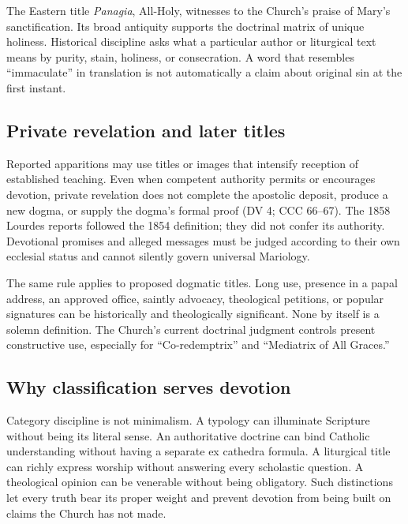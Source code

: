 The Eastern title \emph{Panagia}, All-Holy, witnesses to the Church's praise of Mary's sanctification. Its broad antiquity supports the doctrinal matrix of unique holiness. Historical discipline asks what a particular author or liturgical text means by purity, stain, holiness, or consecration. A word that resembles ``immaculate'' in translation is not automatically a claim about original sin at the first instant.

\subsection{Private revelation and later titles}

Reported apparitions may use titles or images that intensify reception of established teaching. Even when competent authority permits or encourages devotion, private revelation does not complete the apostolic deposit, produce a new dogma, or supply the dogma's formal proof (DV 4; CCC 66--67). The 1858 Lourdes reports followed the 1854 definition; they did not confer its authority. Devotional promises and alleged messages must be judged according to their own ecclesial status and cannot silently govern universal Mariology.

The same rule applies to proposed dogmatic titles. Long use, presence in a papal address, an approved office, saintly advocacy, theological petitions, or popular signatures can be historically and theologically significant. None by itself is a solemn definition. The Church's current doctrinal judgment controls present constructive use, especially for ``Co-redemptrix'' and ``Mediatrix of All Graces.''

\subsection{Why classification serves devotion}

Category discipline is not minimalism. A typology can illuminate Scripture without being its literal sense. An authoritative doctrine can bind Catholic understanding without having a separate ex cathedra formula. A liturgical title can richly express worship without answering every scholastic question. A theological opinion can be venerable without being obligatory. Such distinctions let every truth bear its proper weight and prevent devotion from being built on claims the Church has not made.
